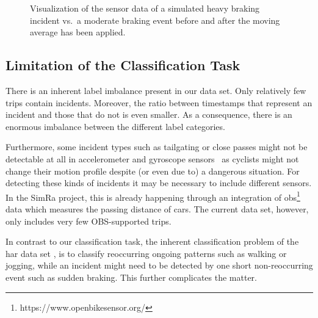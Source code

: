 \begin{figure}[t]
\begin{subfigure}[b]{0.475\textwidth}
	\end{subfigure}
	\caption{Visualization of the sensor data of a simulated heavy braking incident vs.\ a moderate braking event before and after the moving average has been applied.}
	\label{fig:heavy-vs-normal-braking}
\end{figure}

\subsection{Limitation of the Classification Task}
\label{subsec:limitation_of_the_classification_task}
There is an inherent label imbalance present in our data set.
Only relatively few trips contain incidents.
Moreover, the ratio between timestamps that represent an incident and those that do not is even smaller.
As a consequence, there is an enormous imbalance between the different label categories.

Furthermore, some incident types such as tailgating or close passes might not be detectable at all in accelerometer and gyroscope sensors~\cite{aldred2018predictors, karakaya2020simra} as cyclists might not change their motion profile despite (or even due to) a dangerous situation.
For detecting these kinds of incidents it may be necessary to include different sensors.
In the SimRa project, this is already happening through an integration of \ac{obs}\footnote{https://www.openbikesensor.org/} data which measures the passing distance of cars.
The current data set, however, only includes very few OBS-supported trips.

In contrast to our classification task, the inherent classification problem of the \ac{har} data set \cite{anguita2013public}, is to classify reoccurring ongoing patterns such as walking or jogging, while an incident might need to be detected by one short non-reoccurring event such as sudden braking.
This further complicates the matter.

